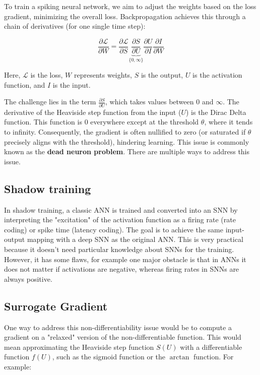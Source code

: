 \documentclass[11pt]{article}
\begin{document}
To train a spiking neural network, we aim to adjust the weights based on the loss gradient, minimizing the overall loss. Backpropagation achieves this through a chain of derivatives (for one single time step):

\begin{equation}
  \frac{\partial \mathcal{L}}{\partial W} =
  \frac{\partial \mathcal{L}}{\partial S}
  \underbrace{\frac{\partial S}{\partial U}}_{\{0, \infty\}}
  \frac{\partial U}{\partial I}
  \frac{\partial I}{\partial W}
\end{equation}
  
Here, $\mathcal{L}$ is the loss, $W$ represents weights, $S$ is the output, $U$ is the activation function, and $I$ is the input.

The challenge lies in the term $\frac{\partial S}{\partial U}$, which takes values between $0$ and $\infty$. The derivative of the Heaviside step function from the input ($U$) is the Dirac Delta function. This function is $0$ everywhere except at the threshold $\theta$, where it tends to infinity. Consequently, the gradient is often nullified to zero (or saturated if $\theta$ precisely aligns with the threshold), hindering learning. This issue is commonly known as the \textbf{dead neuron problem}. There are multiple ways to address this issue.

\subsection{Shadow training}

In shadow training, a classic ANN is trained and converted into an SNN by interpreting the "excitation" of the activation function as a firing rate (rate coding) or spike time (latency coding). The goal is to achieve the same input-output mapping with a deep SNN as the original ANN. This is very practical because it doesn't need particular knowledge about SNNs for the training. However, it has some flaws, for example one major obstacle is that in ANNs it does not matter if activations are negative, whereas firing rates in SNNs are always positive.\cite{pfeiffer2018}

\subsection{Surrogate Gradient}

One way to address this non-differentiability issue would be to compute a gradient on a "relaxed" version of the non-differentiable function. This would mean approximating the Heaviside step function $S(U)$ with a differentiable function $f(U)$, such as the sigmoid function or the $\arctan$ function. For example:
\end{document}

